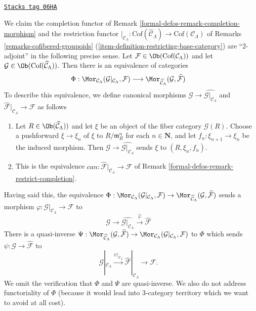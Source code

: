 \begin{remark}
\label{formal-defos-remark-completion-restriction-adjoint}
\href{https://stacks.math.columbia.edu/tag/06HA}{\texttt{Stacks tag 06HA}}

We claim the completion functor of
Remark \ref{formal-defos-remark-completion-morphism}
and the restriction functor
$|_{\mathcal{C}_\Lambda} : \text{Cof}(\widehat{\mathcal{C}}_\Lambda)
\to \text{Cof}(\mathcal{C}_\Lambda)$ of
Remarks \ref{remarks-cofibered-groupoids}
(\ref{item-definition-restricting-base-category})
are ``2-adjoint'' in the following precise sense. Let
$\mathcal{F} \in \Ob(\text{Cof}(\mathcal{C}_\Lambda))$
and let
$\mathcal{G} \in \Ob(\text{Cof}(\widehat{\mathcal{C}}_\Lambda))$.
Then there is an equivalence of categories
$$
\Phi :
\Mor_{\mathcal{C}_\Lambda}(
\mathcal{G}|_{\mathcal{C}_\Lambda}, \mathcal{F})
\longrightarrow
\Mor_{\widehat{\mathcal{C}}_\Lambda}(\mathcal{G}, \widehat{\mathcal{F}})
$$
To describe this equivalence, we
define canonical morphisms
$\mathcal{G} \to \widehat{\mathcal{G}|_{\mathcal{C}_\Lambda}}$ and
$\widehat{\mathcal{F}}|_{\mathcal{C}_\Lambda} \to \mathcal{F}$ as follows
\begin{enumerate}
\item Let $R \in \Ob(\widehat{\mathcal{C}}_\Lambda))$ and let $\xi$
be an object of the fiber category $\mathcal{G}(R)$.
Choose a pushforward $\xi \to \xi_n$ of $\xi$ to
$R/\mathfrak m_R^n$ for each $n \in \mathbf{N}$, and let
$f_n : \xi_{n + 1} \to \xi_n$ be the induced morphism.
Then $\mathcal{G} \to \widehat{\mathcal{G}|_{\mathcal{C}_\Lambda}}$
sends $\xi$ to $(R, \xi_n, f_n)$.
\item This is the equivalence
$can : \widehat{\mathcal{F}}|_{\mathcal{C}_\Lambda} \to \mathcal{F}$
of
Remark \ref{formal-defos-remark-restrict-completion}.
\end{enumerate}
Having said this, the equivalence
$\Phi : \Mor_{\mathcal{C}_\Lambda}(
\mathcal{G}|_{\mathcal{C}_\Lambda}, \mathcal{F})  \to
\Mor_{\widehat{\mathcal{C}}_\Lambda}(\mathcal{G},
\widehat{\mathcal{F}})$
sends a morphism
$\varphi : \mathcal{G}|_{\mathcal{C}_\Lambda} \to \mathcal{F}$
to
$$
\mathcal{G} \to \widehat{\mathcal{G}|_{\mathcal{C}_\Lambda}}
\xrightarrow{\widehat{\varphi}} \widehat{\mathcal{F}}
$$
There is a quasi-inverse
$\Psi :
\Mor_{\widehat{\mathcal{C}}_\Lambda}(
\mathcal{G}, \widehat{\mathcal{F}}) \to
\Mor_{\mathcal{C}_\Lambda}(
\mathcal{G}|_{\mathcal{C}_\Lambda}, \mathcal{F})$
to $\Phi$ which sends $\psi : \mathcal{G} \to \widehat{\mathcal{F}}$ to
$$
\mathcal{G}|_{\mathcal{C}_\Lambda} \xrightarrow{\psi|_{\mathcal{C}_\Lambda}}
\widehat{\mathcal{F}}|_{\mathcal{C}_\Lambda} \to \mathcal{F}.
$$
We omit the verification that $\Phi$ and $\Psi$ are quasi-inverse.
We also do not address functoriality of $\Phi$ (because it would
lead into 3-category territory which we want to avoid at all cost).
\end{remark}

